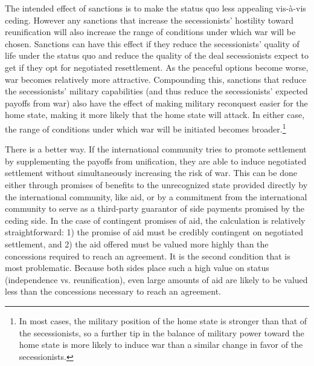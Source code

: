 \documentclass[12pt,letterpaper, notitlepage]{article}
\begin{document}
The intended effect of sanctions is to make the status quo less appealing vis-\`{a}-vis ceding. However any sanctions that increase the secessionists' hostility toward reunification will also increase the range of conditions under which war will be chosen.  Sanctions can have this effect if they reduce the secessionists' quality of life under the status quo %
and reduce the quality of the deal secessionists expect to get if they opt for negotiated resettlement. As the peaceful options become worse, war becomes relatively more attractive.
 Compounding this, sanctions that reduce the secessionists' military capabilities (and thus reduce the secessionists' expected payoffs from war) also have the effect of making military reconquest easier for the home state, making it more likely that the home state will attack. In either case, the range of conditions under which war will be initiated becomes broader.\footnote{In most cases, the military position of the home state is stronger than that of the secessionists, so a further tip in the balance of military power toward the home state is more likely to induce war than a similar change in favor of the secessionists.}


There is a better way. If the international community tries to promote settlement by supplementing the payoffs from unification, they are able to induce negotiated settlement without simultaneously increasing the risk of war.  This can be done either through promises of benefits to the unrecognized state provided directly by the international community, like aid, or by a commitment from the international community to serve as a third-party guarantor of side payments promised by the ceding side. In the case of contingent promises of aid, the calculation is relatively straightforward: 1) the promise of aid must be credibly contingent on negotiated settlement, and 2) the aid offered must be valued more highly than the concessions required to reach an agreement. It is the second condition that is most problematic. Because both sides place such a high value on status (independence vs. reunification), even large amounts of aid are likely to be valued less than the concessions necessary to reach an agreement.
\end{document}
